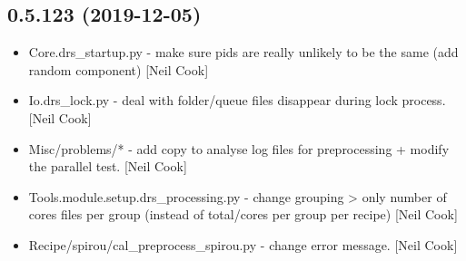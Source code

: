 \documentclass[a4paper,10pt,english]{report}
\begin{document}
\subsection{0.5.123 (2019-12-05)}
\label{\detokenize{misc/changelog:id18}}\begin{itemize}
\item {} 
Core.drs\_startup.py - make sure pids are really unlikely to be the
same (add random component) {[}Neil Cook{]}

\item {} 
Io.drs\_lock.py - deal with folder/queue files disappear during lock
process. {[}Neil Cook{]}

\item {} 
Misc/problems/* - add copy to analyse log files for preprocessing +
modify the parallel test. {[}Neil Cook{]}

\item {} 
Tools.module.setup.drs\_processing.py - change grouping \textendash{}\textgreater{} only number
of cores files per group (instead of total/cores per group  per
recipe) {[}Neil Cook{]}

\item {} 
Recipe/spirou/cal\_preprocess\_spirou.py - change error message. {[}Neil
Cook{]}

\end{itemize}
\end{document}
